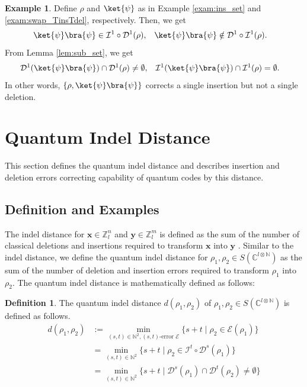 \documentclass[reprint,amsmath,amssymb,aps,]{revtex4-2}
\theoremstyle{definition}
\newtheorem{defi}{Definition}
\newtheorem{exam}{Example}
\newcommand{\SET}[1]{\mathbb{#1}}
\newcommand{\Z}{\SET{Z}}
\newcommand{\N}{\SET{N}}
\newcommand{\C}{\SET{C}}
\newcommand{\1}{\mbox{1}\hspace{-0.25em}\mbox{l}}%
\newcommand{\pure}[2]{\C^{#1 \otimes #2}}
\newcommand{\state}[2]{S(\pure{#1}{#2})}
\newcommand{\QU}[1]{\mathcal{#1}}
\begin{document}
\begin{exam}
  Define
  $\rho$ and $\ket{\psi}$ as in Example \ref{exam:ins_set} and \ref{exam:swap_TinsTdel},
  respectively.
  Then,
  we get
  \begin{align*}
    &\ket{\psi}\bra{\psi}
    \in
    \QU{I}^1 \circ \QU{D}^1(\rho),
    &&\ket{\psi}\bra{\psi}
    \notin
    \QU{D}^1 \circ \QU{I}^1(\rho).
  \end{align*}
  From Lemma \ref{lem:sub_set},
  we get
  \begin{align*}
    &\QU{D}^1(\ket{\psi}\bra{\psi}) \cap \QU{D}^1(\rho)
    \neq
    \emptyset,
    &&\QU{I}^1(\ket{\psi}\bra{\psi}) \cap \QU{I}^1(\rho)
    =
    \emptyset.
  \end{align*}
  In other words,
  $\{ \rho,\ket{\psi}\bra{\psi} \}$ corrects a single insertion
  but not a single deletion.
\end{exam}

\section{Quantum Indel Distance}
\label{sec:Qindel_dis}
This section defines the quantum indel distance and
describes 
insertion and deletion errors correcting capability of quantum codes
by this distance.

\subsection{Definition and Examples}
The indel distance for $\bm{x} \in \Z_l^n$ and $\bm{y} \in \Z_l^m$ is
defined as the sum of the number of classical deletions and insertions
required to transform $\bm{x}$ into $\bm{y}$ \cite{levenshtein1966binary}.
Similar to the indel distance,
we define
the quantum indel distance for $\rho_1, \rho_2 \in \state{l}{\N}$ as
the sum of the number of deletion and insertion errors
required to transform
$\rho_1$ into $\rho_2$.
The quantum indel distance is mathematically defined as follows:

\begin{defi}
  The quantum indel distance $d( \rho_1, \rho_2 )$ of $\rho_1, \rho_2 \in \state{l}{\N}$
  is defined as follows.
  \begin{align*}
    d( \rho_1, \rho_2 )
    &:=
    \min_{(s,t) \in \N^2, (s,t)\text{-error~}\QU{E}}
    \{
    s+t
    \mid
    \rho_2
    \in
    \QU{E}(\rho_1)
    \}\\
    &=
    \min_{(s,t) \in \N^2}
    \{
    s+t
    \mid
    \rho_2
    \in
    \QU{I}^t \circ \QU{D}^s(\rho_1)
    \}\\
    &=
    \min_{(s,t) \in \N^2}
    \{
    s+t
    \mid
    \QU{D}^s(\rho_1) \cap \QU{D}^t(\rho_2)
    \neq
    \emptyset
    \}
  \end{align*}
\end{defi}
\end{document}
